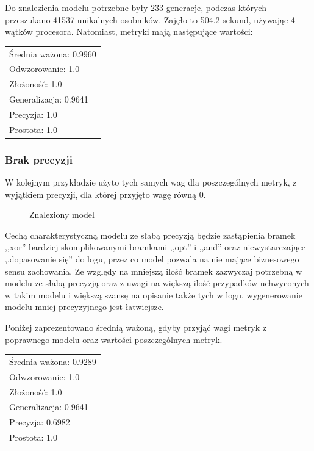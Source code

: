 Do znalezienia modelu potrzebne były 233 generacje, podczas których przeszukano 41537 unikalnych osobników. Zajęło to 504.2 sekund, używając 4 wątków procesora. Natomiast, metryki mają następujące wartości: 

 \begin{center}
  \begin{tabular}{l}
	Średnia ważona: 0.9960 \\
	Odwzorowanie: 1.0 \\
	Złożoność: 1.0 \\
	Generalizacja: 0.9641 \\
	Precyzja: 1.0 \\
	Prostota: 1.0
  \end{tabular}
 \end{center}

\subsubsection{Brak precyzji}
W kolejnym przykładzie użyto tych samych wag dla poszczególnych metryk, z wyjątkiem precyzji, dla której przyjęto wagę równą 0.
\begin{figure}[!ht]
	\caption{\label{fig:flow_chart}Znaleziony model}
\end{figure}

Cechą charakterystyczną modelu ze słabą precyzją będzie zastąpienia bramek ,,xor'' bardziej skomplikowanymi bramkami ,,opt'' i ,,and'' oraz niewystarczające ,,dopasowanie się'' do logu, przez co model pozwala na nie mające biznesowego sensu zachowania. Ze względy na mniejszą ilość bramek zazwyczaj potrzebną w modelu ze słabą precyzją oraz z uwagi na większą ilość przypadków uchwyconych w takim modelu i większą szansę na opisanie także tych w logu, wygenerowanie modelu mniej precyzyjnego jest łatwiejsze.
 
Poniżej zaprezentowano średnią ważoną, gdyby przyjąć wagi metryk z poprawnego modelu oraz wartości poszczególnych metryk. 
 \begin{center}
  \begin{tabular}{l}
	Średnia ważona: 0.9289 \\
	Odwzorowanie: 1.0 \\
	Złożoność: 1.0 \\
	Generalizacja: 0.9641 \\
	Precyzja: 0.6982 \\
	Prostota: 1.0
  \end{tabular}
 \end{center}
 

